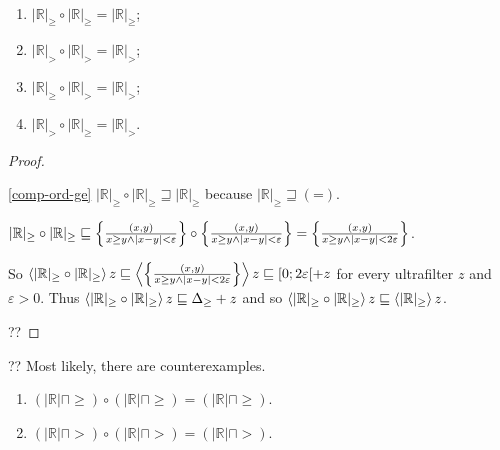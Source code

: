 
\begin{prop}
~
\begin{enumerate}
\item\label{comp-ord-ge} $| \mathbb{R} |_{\geq} \circ | \mathbb{R} |_{\geq} = | \mathbb{R} |_{\geq}$;
\item\label{comp-ord-gt} $| \mathbb{R} |_{>} \circ | \mathbb{R} |_{>} = | \mathbb{R} |_{>}$;
\item\label{comp-ord-gt} $| \mathbb{R} |_{\geq} \circ | \mathbb{R} |_{>} = | \mathbb{R} |_{>}$;
\item\label{comp-ord-gt} $| \mathbb{R} |_{>} \circ | \mathbb{R} |_{\geq} = | \mathbb{R} |_{>}$.
\end{enumerate}  
\end{prop}

\begin{proof}
~
\begin{widedisorder}
\item[\ref{comp-ord-ge}]
  $| \mathbb{R} |_{\geq} \circ | \mathbb{R} |_{\geq} \sqsupseteq |
  \mathbb{R} |_{\geq}$ because $| \mathbb{R} |_{\geq} \sqsupseteq
  {(\mathord{=})}$.
  
  $| \mathbb{R} |_{\geq} \circ | \mathbb{R} |_{\geq} \sqsubseteq \left\{ \frac{ (x,
  y) }{ x \geq y \wedge | x - y | < \varepsilon
  }\right\} \circ \left\{ \frac{ (x, y) }{ x \geq y \wedge |
  x - y | < \varepsilon }\right\} = \left\{ \frac{ (x, y) }{
  x \geq y \wedge | x - y | < 2 \varepsilon }\right\}$.
  
  So $\left\langle  | \mathbb{R} |_{\geq} \circ | \mathbb{R} |_{\geq} \right\rangle z
  \sqsubseteq \left\langle  \left\{ \frac{ (x, y) }{ x \geq y
  \wedge | x - y | < 2 \varepsilon }\right\} \right\rangle z \sqsubseteq [0 ; 2
  \varepsilon [+ z$ for every ultrafilter $z$ and $\varepsilon > 0$. Thus
  $\left\langle  | \mathbb{R} |_{\geq} \circ | \mathbb{R} |_{\geq} \right\rangle z
  \sqsubseteq \Delta_{\geq} + z$ and so $\left\langle  | \mathbb{R} |_{\geq} \circ |
  \mathbb{R} |_{\geq} \right\rangle z \sqsubseteq \left\langle  | \mathbb{R} |_{\geq}
  \right\rangle z$.
\end{widedisorder}
??
\end{proof}

\begin{prop}
?? Most likely, there are counterexamples.
\begin{enumerate}
\item $(|\mathbb{R}| \sqcap {\geq}) \circ (|\mathbb{R}| \sqcap {\geq}) = (|\mathbb{R}| \sqcap {\geq})$.
\item $(|\mathbb{R}| \sqcap {>}) \circ (|\mathbb{R}| \sqcap {>}) = (|\mathbb{R}| \sqcap {>})$.
\end{enumerate}
\end{prop}

